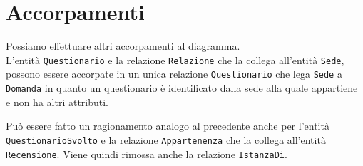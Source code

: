 \section{Accorpamenti}\label{sec:mergers}
Possiamo effettuare altri accorpamenti al diagramma.\\

L'entità {\tt Questionario} e la relazione {\tt Relazione} che la collega all'entità {\tt Sede},
possono essere accorpate in un unica relazione {\tt Questionario} che lega {\tt Sede}
a {\tt Domanda} in quanto un questionario è identificato dalla sede alla quale appartiene
e non ha altri attributi.

Può essere fatto un ragionamento analogo al precedente anche per l'entità {\tt QuestionarioSvolto}
e la relazione {\tt Appartenenza} che la collega all'entità {\tt Recensione}. Viene
quindi rimossa anche la relazione {\tt IstanzaDi}.
